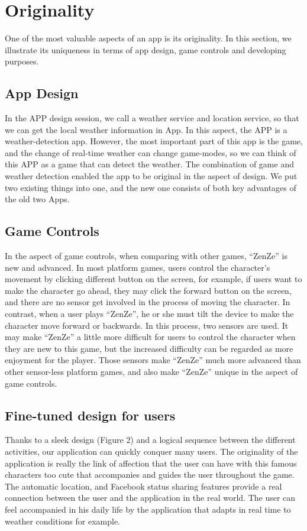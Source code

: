 \documentclass{sigchi}
\begin{document}
\section{Originality}
One of the most valuable aspects of an app is its originality. In this section, we illustrate its uniqueness in terms of app design, game controls and developing purposes.
\subsection{App Design}
In the APP design session, we call a weather service and location service, so that we can get the local weather information in App. In this aspect, the APP is a weather-detection app. However, the most important part of this app is the game, and the change of real-time weather can change game-modes, so we can think of this APP as a game that can detect the weather. The combination of game and weather detection enabled the app to be original in the aspect of design. We put two existing things into one, and the new one consists of both key advantages of the old two Apps.

\subsection{Game Controls}
In the aspect of game controls, when comparing with other games, ``ZenZe'' is new and advanced. In most platform games, users control the character's movement by clicking different button on the screen, for example, if users want to make the character go ahead, they may click the forward button on the screen, and there are no sensor get involved in the process of moving the character. 
In contrast, when a user plays ``ZenZe'', he or she must tilt the device to make the character move forward or backwards. In this process, two sensors are used. It may make ``ZenZe'' a little more difficult for users to control the character when they are new to this game, but the increased difficulty can be regarded as more enjoyment for the player. Those sensors make ``ZenZe'' much more advanced than other sensor-less platform games, and also make ``ZenZe'' unique in the aspect of game controls.

\subsection{Fine-tuned design for users}
Thanks to a sleek design (Figure 2) and a logical sequence between the different activities, our application can quickly conquer many users. The originality of the application is really the link of affection that the user can have with this famous characters too cute that accompanies and guides the user throughout the game. The automatic location, and Facebook status sharing features provide a real connection between the user and the application in the real world. The user can feel accompanied in his daily life by the application that adapts in real time to weather conditions for example.
\end{document}
